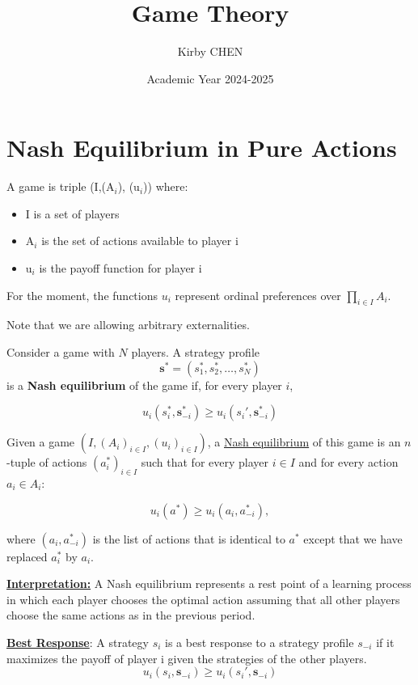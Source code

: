 \documentclass[12pt, oneside]{article}
\title{Game Theory}
\author{Kirby CHEN}
\date{Academic Year 2024-2025}
\begin{document}
\maketitle
\tableofcontents

\vspace{.25in}

\section{Nash Equilibrium in Pure Actions}

A game is triple (I,(A$_i$), (u$_i$)) where:
\begin{itemize}
    \item I is a set of players
    \item A$_i$ is the set of actions available to player i
    \item u$_i$ is the payoff function for player i
\end{itemize}

For the moment, the functions \( u_i \) represent ordinal preferences over \( \prod_{i \in I} A_i \).

Note that we are allowing arbitrary externalities.

Consider a game with \( N \) players. A strategy profile  
\[
\mathbf{s^*} = (s_1^*, s_2^*, \dots, s_N^*)
\]  
is a \textbf{Nash equilibrium} of the game if, for every player \( i \),

\[
u_i(s_i^*, \mathbf{s}_{-i}^*) \geq u_i(s_i', \mathbf{s}_{-i}^*)
\]

Given a game \( (I, (A_i)_{i \in I}, (u_i)_{i \in I}) \), a \underline{Nash equilibrium} of this game is an \( n \)-tuple of actions \( (a^*_i)_{i \in I} \) such that for every player \( i \in I \) and for every action \( a_i \in A_i \):

\[
u_i(a^*) \geq u_i(a_i, a^*_{-i}),
\]

where \( (a_i, a^*_{-i}) \) is the list of actions that is identical to \( a^* \) except that we have replaced \( a^*_i \) by \( a_i \).

\underline{\textbf{Interpretation:}} A Nash equilibrium represents a rest point of a learning process in which each player chooses the optimal action assuming that all other players choose the same actions as in the previous period.

\underline{\textbf{Best Response}}: A strategy \( s_i \) is a best response to a strategy profile \( s_{-i} \) if it maximizes the payoff of player i given the strategies of the other players.
\[
u_i(s_i, \mathbf{s}_{-i}) \geq u_i(s_i', \mathbf{s}_{-i})
\]
\end{document}
